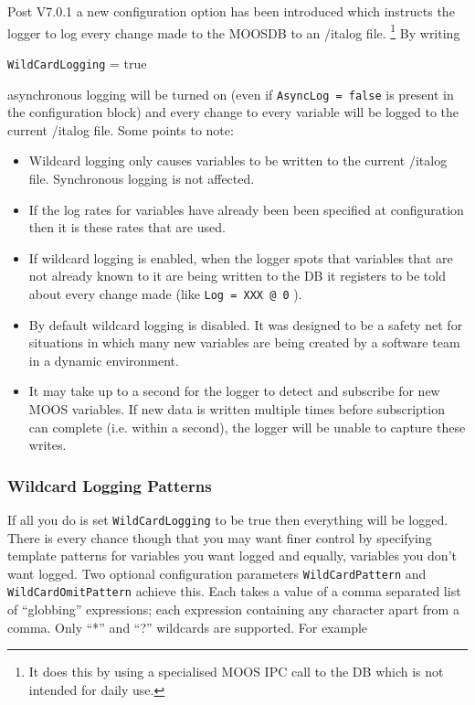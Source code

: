 \documentclass[a4paper,10pt]{article}
\newcommand{\Code}[1]{\texttt{#1} }
\newcommand{\code}[1]{\Code{#1} }
\begin{document}
Post V7.0.1 a new configuration option has been introduced which instructs the logger to log every change made to the MOOSDB to an {/it{alog}} file. \footnote{It does this by using a specialised MOOS IPC call to the DB which is not intended for daily use.} By writing

\begin{center}
\code{WildCardLogging} =  true
\end{center}

asynchronous logging will be turned on (even if \code{AsyncLog = false} is present in the configuration block) and every change to every variable will be logged to the current {/it{alog}} file. Some points to note:

\begin{itemize}
\item Wildcard logging only causes variables to be written to the current {/it{alog}} file. Synchronous logging is not affected.
\item If the log rates for variables have already been been specified at configuration then it is these rates that are used.
\item If wildcard logging is enabled, when the logger spots that variables that are not already known to it are being written to the DB it registers to be told about every change made (like \code{Log = XXX @ 0}).
\item By default wildcard logging is disabled. It was designed to be a safety net for situations in which many new variables are being created by a software team in a dynamic environment.
\item It may take up to a second for the logger to detect and subscribe for new MOOS variables. If new data is written multiple times before subscription can complete (i.e. within a second), the logger will be unable to capture these writes.
\end{itemize}


\subsubsection{Wildcard Logging Patterns}

If all you do is set \code{WildCardLogging} to be true then everything will be logged. There is every chance though that you may want finer control by specifying template patterns for variables you want logged and equally, variables you don't want logged. Two optional configuration parameters \code{WildCardPattern} and \code{WildCardOmitPattern} achieve this. Each takes a value of a comma separated list of  ``globbing'' expressions; each expression containing any character apart from a comma. Only ``*'' and ``?'' wildcards are supported.  For example
\end{document}
